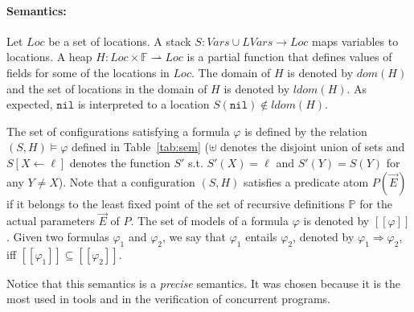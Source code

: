 \documentclass[twoside,11pt]{article}
\newcommand{\limp}{\Rightarrow}
\newcommand{\vars}{\mathit{Vars}}
\newcommand{\lvars}{\mathit{LVars}}
\newcommand{\pfields}{\mathbb{F}}
\newcommand{\preds}{\mathbb{P}}
\newcommand{\loc}{\mathit{Loc}}
\newcommand{\model}[1]{\left[\!\left[#1\right]\!\right]}
\newcommand{\nil}{\mathtt{nil}}
\begin{document}
\paragraph{Semantics:}
Let $\loc$ be a set of locations. 
A stack $S : \vars\cup\lvars\rightarrow \loc$ maps
variables to locations. 
A heap $H:\loc\times\pfields\rightharpoonup\loc$ is a partial
function that defines values of fields for some of the locations in $\loc$.
%
The domain of $H$ is denoted by $\mathit{dom}(H)$ and
the set of locations in the domain of $H$ is denoted by $\mathit{ldom}(H)$.  
As expected, $\nil$ is interpreted to a location $S(\nil)\not\in \mathit{ldom}(H)$.

The set of configurations satisfying a formula $\varphi$ is defined by the relation
$(S,H)\models \varphi$ defined in Table~\ref{tab:sem} ($\uplus$
denotes the disjoint union of sets and $S[X\gets\ell]$ denotes the function
$S'$ s.t.  $S'(X)=\ell$ and $S'(Y)=S(Y)$ for any $Y\neq X$).
Note that a configuration $(S,H)$ satisfies a predicate atom 
$P(\vec{E})$ if it belongs to the least fixed point of the set of recursive definitions $\preds$ for the actual parameters $\vec{E}$ of $P$.
The set of models of a formula $\varphi$ is denoted by $\model{\varphi}$. Given two
formulas $\varphi_1$ and $\varphi_2$, we say that $\varphi_1$ entails
$\varphi_2$, denoted by $\varphi_1\limp\varphi_2$, iff
$\model{\varphi_1}\subseteq \model{\varphi_2}$. 

Notice that this semantics is a \emph{precise} semantics. It was chosen because it is the most used in tools and in the verification of concurrent programs.
\end{document}
